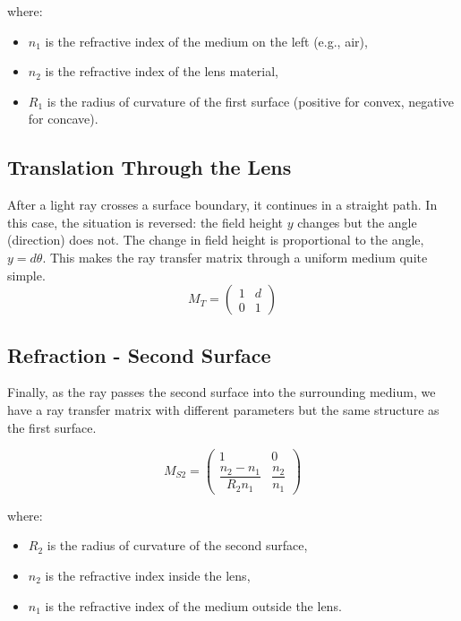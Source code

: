 \documentclass[
  letterpaper,
]{book}
\providecommand{\tightlist}{%
  \setlength{\itemsep}{0pt}\setlength{\parskip}{0pt}}\usepackage{longtable,booktabs,array}
\begin{document}
where:

\begin{itemize}
\tightlist
\item
  \(n_1\) is the refractive index of the medium on the left (e.g., air),
\item
  \(n_2\) is the refractive index of the lens material,
\item
  \(R_1\) is the radius of curvature of the first surface (positive for
  convex, negative for concave).
\end{itemize}

\subsection{Translation Through the
Lens}\label{translation-through-the-lens}

After a light ray crosses a surface boundary, it continues in a straight
path. In this case, the situation is reversed: the field height \(y\)
changes but the angle (direction) does not. The change in field height
is proportional to the angle, \(y = d \theta\). This makes the ray
transfer matrix through a uniform medium quite simple. \[
M_{T} =
\begin{pmatrix}
1 & d \\
0 & 1
\end{pmatrix}
\]

\subsection{Refraction - Second
Surface}\label{refraction---second-surface}

Finally, as the ray passes the second surface into the surrounding
medium, we have a ray transfer matrix with different parameters but the
same structure as the first surface.

\[
M_{S2} =
\begin{pmatrix}
1 & 0 \\
\dfrac{n_2 - n_1}{R_2 n_1} & \dfrac{n_2}{n_1}
\end{pmatrix}
\]

where:

\begin{itemize}
\tightlist
\item
  \(R_2\) is the radius of curvature of the second surface,
\item
  \(n_2\) is the refractive index inside the lens,
\item
  \(n_1\) is the refractive index of the medium outside the lens.
\end{itemize}
\end{document}
